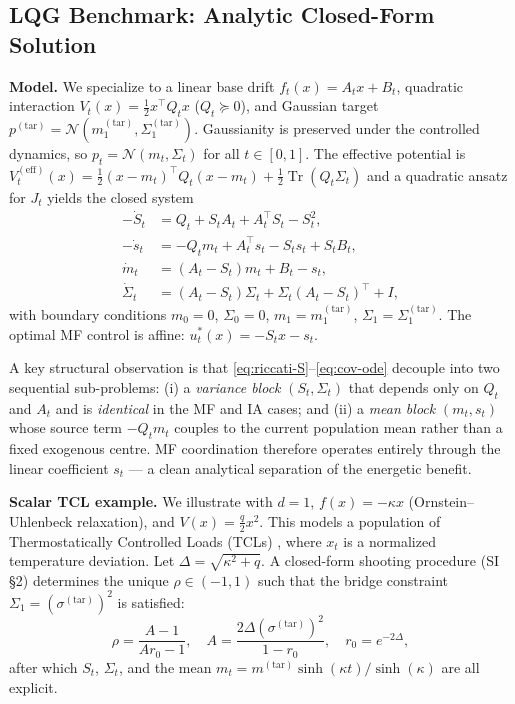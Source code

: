 \documentclass[11pt,onecolumn]{article}
\newcommand{\calN}{\mathcal{N}}
\newcommand{\tr}{\operatorname{Tr}}
\newcommand{\ptar}{p^{(\mathrm{tar})}}
\newcommand{\Veff}{V^{(\mathrm{eff})}}
\begin{document}
\subsection*{LQG Benchmark: Analytic Closed-Form Solution}

\textbf{Model.}
We specialize to a linear base drift $f_t(x) = A_t x + B_t$,
quadratic interaction $V_t(x) = \tfrac{1}{2}x^\top Q_t x$
($Q_t \succeq 0$), and Gaussian target
$\ptar = \calN(m_1^{(\mathrm{tar})},\Sigma_1^{(\mathrm{tar})})$.
Gaussianity is preserved under the controlled dynamics, so
$p_t = \calN(m_t,\Sigma_t)$ for all $t \in [0,1]$.
The effective potential is
$\Veff_t(x) = \tfrac{1}{2}(x{-}m_t)^\top Q_t(x{-}m_t)
+ \tfrac{1}{2}\tr(Q_t\Sigma_t)$
and a quadratic ansatz for $J_t$ yields the closed system
\begin{align}
  -\dot S_t &= Q_t + S_t A_t + A_t^\top S_t - S_t^2,
  \label{eq:riccati-S}\\
  -\dot s_t &= -Q_t m_t + A_t^\top s_t - S_t s_t + S_t B_t,
  \label{eq:riccati-s}\\
  \dot m_t &= (A_t - S_t)m_t + B_t - s_t,
  \label{eq:mean-ode}\\
  \dot\Sigma_t &= (A_t-S_t)\Sigma_t + \Sigma_t(A_t-S_t)^\top + I,
  \label{eq:cov-ode}
\end{align}
with boundary conditions $m_0=0$, $\Sigma_0=0$,
$m_1=m_1^{(\mathrm{tar})}$, $\Sigma_1=\Sigma_1^{(\mathrm{tar})}$.
The optimal MF control is affine: $u_t^*(x) = -S_t x - s_t$.

A key structural observation is that
\eqref{eq:riccati-S}--\eqref{eq:cov-ode} decouple into two
sequential sub-problems: (i) a \emph{variance block}
$(S_t,\Sigma_t)$ that depends only on $Q_t$ and $A_t$ and is
\emph{identical} in the MF and IA cases; and (ii) a \emph{mean block}
$(m_t, s_t)$ whose source term $-Q_t m_t$ couples to the current
population mean rather than a fixed exogenous centre.
MF coordination therefore operates entirely through the linear
coefficient $s_t$ --- a clean analytical separation of the energetic
benefit.

\textbf{Scalar TCL example.}
We illustrate with $d=1$, $f(x) = -\kappa x$
(Ornstein--Uhlenbeck relaxation), and $V(x) = \tfrac{q}{2}x^2$.
This models a population of Thermostatically Controlled Loads (TCLs)
\cite{callaway_tapping_2009,callaway_achieving_2011,hao_aggregate_2015,grammatico_mean_2015,metivier_mean-field_2020,valenzuela_statistical_2023},
where $x_t$ is a normalized temperature deviation.
Let $\Delta = \sqrt{\kappa^2+q}$.
A closed-form shooting procedure (SI\,\S2) determines the unique
$\rho \in (-1,1)$ such that the bridge constraint
$\Sigma_1 = (\sigma^{(\mathrm{tar})})^2$ is satisfied:
\begin{equation}
  \rho = \frac{A-1}{Ar_0-1},
  \quad
  A = \frac{2\Delta(\sigma^{(\mathrm{tar})})^2}{1-r_0},
  \quad
  r_0 = e^{-2\Delta},
  \label{eq:rho}
\end{equation}
after which $S_t$, $\Sigma_t$, and the mean
$m_t = m^{(\mathrm{tar})}\sinh(\kappa t)/\sinh(\kappa)$
are all explicit.
\end{document}
